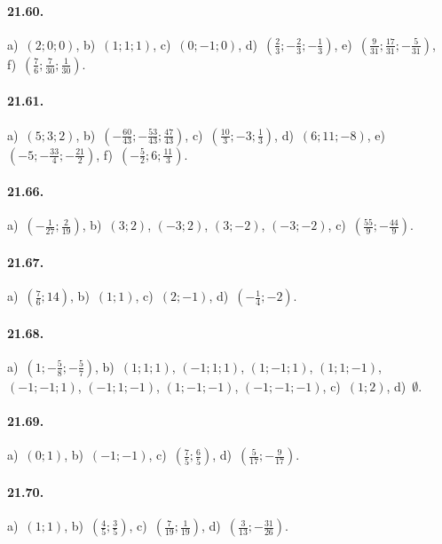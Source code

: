 \paragraph{21.60.} a)~$(2; 0; 0)$, \quad b)~$(1; 1; 1)$, \quad c)~$(0; -1; 0)$, \quad d)~$\left(\frac{2}{3};-\frac{2}{3};-\frac{1}{3}\right)$, \quad e)~$\left(\frac{9}{31};\frac{17}{31};-\frac{5}{31}\right)$, \protect\\ f)~$\left(\frac{7}{6};\frac{7}{30};\frac{1}{30}\right)$.

\paragraph{21.61.} a)~$(5; 3; 2)$, \quad b)~$\left(-{\frac{60}{43}};-\frac{53}{43};\frac{47}{43}\right)$, \quad  c)~$\left(\frac{10}{3};-3;\frac{1}{3}\right)$,
\quad d)~$(6; 11; -8)$, e)~$\left(-5;-\frac{33}{4};-\frac{21}{2}\right)$, f)~$\left(-{\frac{5}{2}};6;\frac{11}{3}\right)$.

\paragraph{21.66.} a)~$\left(-{\frac{1}{27}};\frac{2}{19}\right)$, \quad b)~$(3;2)$, $(-3;2)$, $(3;-2)$, $(-3;-2)$,
\quad c)~$\left(\frac{55}{9};-\frac{44}{9}\right)$.

\paragraph{21.67.} a)~$\left(\frac{7}{6};14\right)$, \quad b)~$\left(1;1\right)$, \quad c)~$\left(2;-1\right)$, \quad d)~$\left(-{\frac{1}{4}};-2\right)$.

\paragraph{21.68.} a)~$\left(1;-\frac{5}{8};-\frac{5}{7}\right)$, \quad b)~$(1;1;1)$, $(-1;1;1)$, $(1;-1;1)$, $(1;1;-1)$, $(-1;-1;1)$, $(-1;1;-1)$, $(1;-1;-1)$, $(-1;-1;-1)$, \quad c)~$(1;2)$, \quad d)~$\emptyset $.


\paragraph{21.69.} a)~$(0;1)$, \quad b)~$(-1;-1)$, \quad c)~$\left(\frac{7}{5};\frac{6}{5}\right)$, \quad d)~$\left(\frac{5}{17};-\frac{9}{17}\right)$.

\paragraph{21.70.} a)~$\left(1;1\right)$, \quad b)~$\left(\frac{4}{5};\frac{3}{5}\right)$, \quad c)~$\left(\frac{7}{19};\frac{1}{19}\right)$,
\quad d)~$\left(\frac{3}{13};-\frac{31}{26}\right)$.

